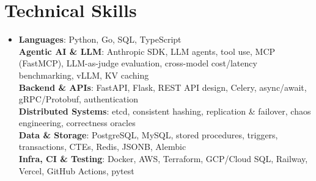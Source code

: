 \documentclass[letterpaper,11pt]{article}
\begin{document}
\section{Technical Skills}
\begin{itemize}[leftmargin=0.15in, label={}]
  \small\item{
    \textbf{Languages}{:  Python, Go, SQL, TypeScript} \\
    \textbf{Agentic AI \& LLM}{:  Anthropic SDK, LLM agents, tool use, MCP (FastMCP), LLM-as-judge evaluation, cross-model cost/latency benchmarking, vLLM, KV caching} \\
    \textbf{Backend \& APIs}{:  FastAPI, Flask, REST API design, Celery, async/await, gRPC/Protobuf, authentication} \\
    \textbf{Distributed Systems}{:  etcd, consistent hashing, replication \& failover, chaos engineering, correctness oracles} \\
    \textbf{Data \& Storage}{:  PostgreSQL, MySQL, stored procedures, triggers, transactions, CTEs, Redis, JSONB, Alembic} \\
    \textbf{Infra, CI \& Testing}{:  Docker, AWS, Terraform, GCP/Cloud SQL, Railway, Vercel, GitHub Actions, pytest}
  }
\end{itemize}
\end{document}
